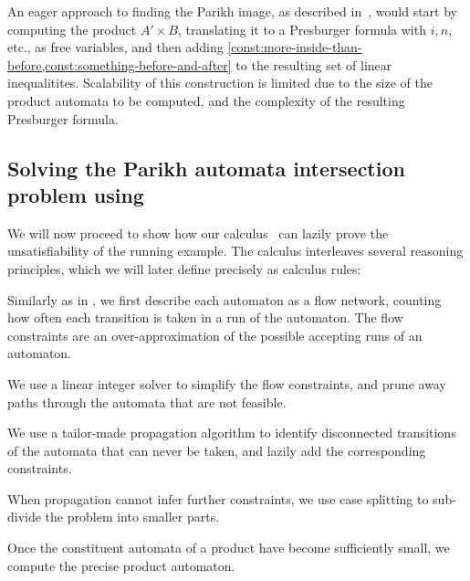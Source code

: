 
An eager approach to finding the Parikh
image, as described in~\cite{generate-parikh-image}, would start by
computing the product $A' \times B$, translating it to a Presburger formula with
$i, n$, etc., as free variables, and then adding
\cref{const:more-inside-than-before,const:something-before-and-after} to the
resulting set of linear inequalitites. Scalability of this
construction is limited due to the size of the product automata to be computed,
and the complexity of the resulting Presburger formula.

\subsection{Solving the Parikh automata intersection problem using \Calculus{}}

We will now proceed to show how our calculus~\Calculus{} can lazily
prove the unsatisfiability of the running example. The calculus
interleaves several reasoning principles, which we will later
define precisely as calculus rules:
\begin{inparaenum}[(i)]
\item Similarly as in \cite{generate-parikh-image}, we first describe
  each automaton as a flow network, counting how often each transition
  is taken in a run of the automaton. The flow constraints are an
  over-approximation of the possible accepting runs of an automaton.
\item We use a linear integer solver to simplify the flow constraints,
  and prune away paths through the automata that are not feasible.
\item We use a tailor-made propagation algorithm to identify disconnected
  transitions of the automata that can never be taken, and lazily add
  the corresponding constraints.
\item When propagation cannot infer further constraints, we use case
  splitting to sub-divide the problem into smaller parts.
\item Once the constituent automata of a product have become
  sufficiently small, we compute the precise product automaton.
\end{inparaenum}

